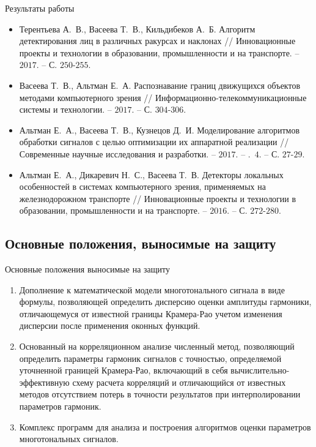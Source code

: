 \begin{frame}{Результаты работы}
\scriptsize{
\begin{itemize}
	\item Терентьева А.~В., Васеева Т.~В., Кильдибеков А.~Б. Алгоритм детектирования лиц в различных ракурсах и наклонах // Инновационные проекты и технологии в образовании, промышленности и на транспорте. – $2017$. – С. $250$-$255$.
	
	\item Васеева Т.~В., Альтман Е.~А. Распознавание границ движущихся объектов методами компьютерного зрения // Информационно-телекоммуникационные системы и технологии. – $2017$. – С. $304$-$306$.
	
	\item Альтман Е.~А., Васеева Т.~В., Кузнецов Д.~И. Моделирование алгоритмов обработки сигналов с целью оптимизации их аппаратной реализации // Современные научные исследования и разработки. – $2017$. – \textnumero.~$4$. – С. $27$-$29$.	
	
	\item Альтман Е.~А., Дикаревич Н.~С., Васеева Т.~В. Детекторы локальных особенностей в системах компьютерного зрения, применяемых на железнодорожном транспорте // Инновационные проекты и технологии в образовании, промышленности и на транспорте. – $2016$. – С. $272$-$280$.
\end{itemize}}
\end{frame}

\subsection{Основные положения, выносимые на защиту}
\begin{frame}{Основные положения выносимые на защиту}
	\begin{enumerate}
		\item Дополнение к математической модели многотонального сигнала в виде формулы, позволяющей определить дисперсию оценки амплитуды гармоники, отличающемуся от известной границы Крамера-Рао учетом изменения дисперсии после применения оконных функций.
		\item Основанный на корреляционном анализе численный метод, позволяющий определить параметры гармоник сигналов с точностью, определяемой уточненной границей Крамера-Рао, включающий в себя вычислительно-эффективную схему расчета корреляций и отличающийся от известных методов отсутствием потерь в точности результатов при интерполировании параметров гармоник.
		\item Комплекс программ для анализа и построения алгоритмов оценки параметров многотональных сигналов.
	\end{enumerate}
\end{frame}

